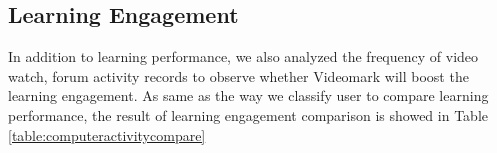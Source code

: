 \begin{table}[H]
\centering
\caption{Comparison User's Learning Performance}
\end{table}


\subsection{Learning Engagement}
In addition to learning performance, we also analyzed the frequency of video watch, forum activity records to observe whether Videomark will boost the learning engagement.
As same as the way we classify user to compare learning performance, the result of learning engagement comparison is showed in Table \ref{table:computeractivitycompare}
\begin{table}[H]
\centering
\caption{Comparison User's Learning Engagement}
\label{table:computeractivitycompare}
\end{table}


